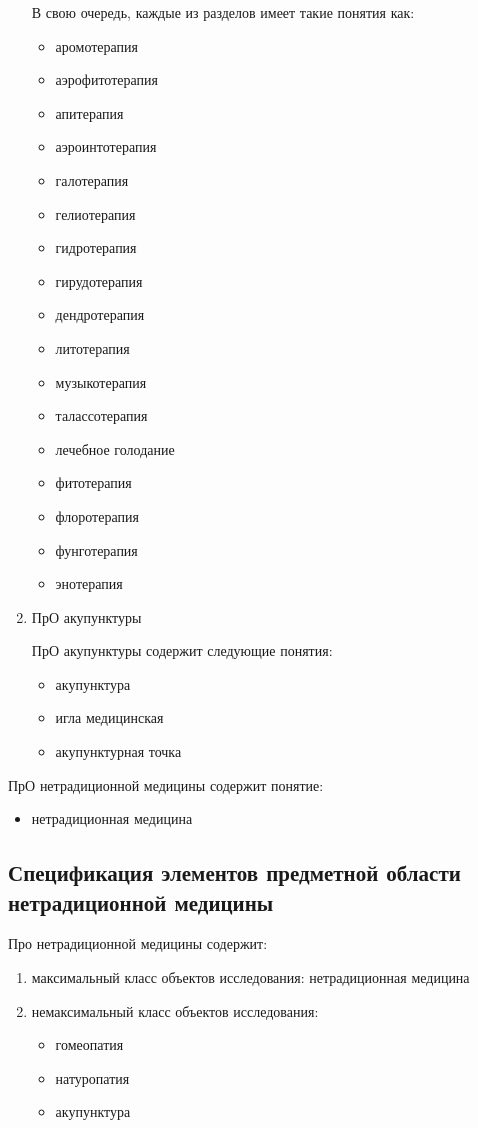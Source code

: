 \begin{enumerate}
В свою очередь, каждые из разделов имеет такие понятия как:
\begin{itemize}
	\item аромотерапия
	\item аэрофитотерапия
	\item апитерапия 
	\item аэроинтотерапия
	\item галотерапия
	\item гелиотерапия
	\item гидротерапия
	\item гирудотерапия
	\item дендротерапия
	\item литотерапия
	\item музыкотерапия 
	\item талассотерапия
	\item лечебное голодание
	\item фитотерапия
	\item флоротерапия
	\item фунготерапия
	\item энотерапия\\
\end{itemize}

\item ПрО акупунктуры

ПрО акупунктуры содержит следующие понятия:
\begin{itemize}
	\item акупунктура 
	\item игла медицинская
	\item акупунктурная точка\\
\end{itemize}
\end{enumerate} 

ПрО нетрадиционной медицины содержит понятие:
\begin{itemize}
	\item нетрадиционная медицина\\
\end{itemize}

\subsection{Спецификация элементов предметной области нетрадиционной медицины}
Про нетрадиционной медицины содержит:
\begin{enumerate}
	\item максимальный класс объектов исследования: нетрадиционная медицина
	\item немаксимальный класс объектов исследования: \begin{itemize}
		\item гомеопатия 
		\item натуропатия
		\item акупунктура\\
	\end{itemize}
\end{enumerate}

